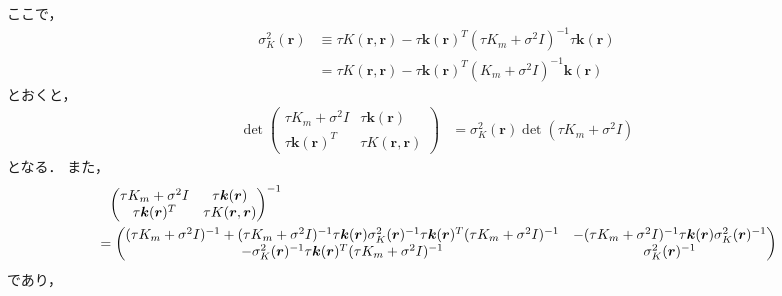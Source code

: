 ここで，
\begin{align}
    \sigma_K^2(\bm{r})
     & \equiv \tau K(\bm{r}, \bm{r})
    - \tau \bm{k}(\bm{r})^T (\tau K_m + \sigma^2 I)^{-1} \tau \bm{k}(\bm{r}) \\
     & = \tau K(\bm{r}, \bm{r})
    - \tau \bm{k}(\bm{r})^T (K_m + \sigma^2 I)^{-1} \bm{k}(\bm{r})
\end{align}
とおくと，
\begin{align}
    \det{
        \begin{pmatrix}
            \tau K_m + \sigma^2 I & \tau \bm{k}(\bm{r})    \\
            \tau \bm{k}(\bm{r})^T & \tau K(\bm{r}, \bm{r})
        \end{pmatrix}
    }
     & = \sigma_K^2(\bm{r}) \det(\tau K_m + \sigma^2 I)
\end{align}
となる．
また，
\begin{align}
     & \hphantom{=}
    \begin{pmatrix}
        \tau K_m + \sigma^2 I & \tau \bm{k}(\bm{r})    \\
        \tau \bm{k}(\bm{r})^T & \tau K(\bm{r}, \bm{r})
    \end{pmatrix}^{-1}
    \notag          \\
     & =
    \begin{pmatrix}
        (\tau K_m + \sigma^2 I)^{-1}
        + (\tau K_m + \sigma^2 I)^{-1} \tau \bm{k}(\bm{r}) \sigma_K^2(\bm{r})^{-1} \tau \bm{k}(\bm{r})^T (\tau K_m + \sigma^2 I)^{-1}
         &
        - (\tau K_m + \sigma^2 I)^{-1} \tau \bm{k}(\bm{r}) \sigma_K^2(\bm{r})^{-1}
        \\
        - \sigma_K^2(\bm{r})^{-1} \tau \bm{k}(\bm{r})^T (\tau K_m + \sigma^2 I)^{-1}
         &
        \sigma_K^2(\bm{r})^{-1}
    \end{pmatrix}
\end{align}
であり，
